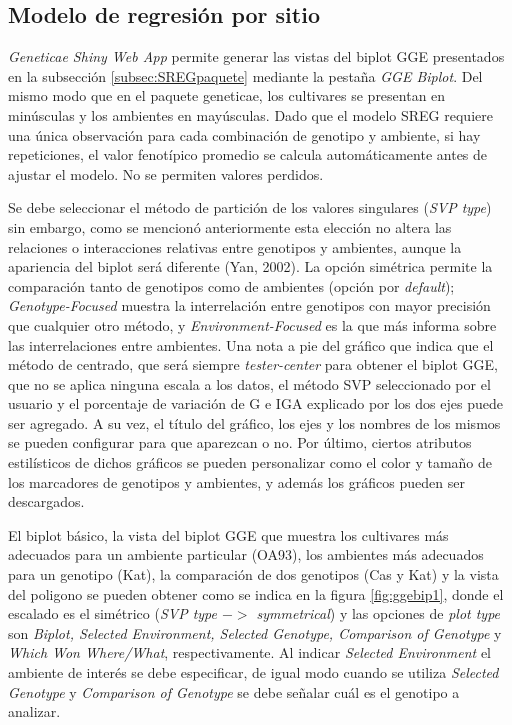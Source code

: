 \subsection{Modelo de regresión por sitio}

\emph{Geneticae Shiny Web App} permite generar las vistas del biplot GGE presentados en la subsección \ref{subsec:SREGpaquete} mediante la pestaña \emph{GGE Biplot}. Del mismo modo que en el paquete geneticae, los cultivares se presentan en minúsculas y los ambientes en mayúsculas. Dado que el modelo SREG requiere una única observación para cada combinación de genotipo y ambiente, si hay repeticiones, el valor fenotípico promedio se calcula automáticamente antes de ajustar el modelo. No se permiten valores perdidos. 

Se debe seleccionar el método de partición de los valores singulares (\emph{SVP type}) sin embargo, como se mencionó anteriormente esta elección no altera las relaciones o interacciones relativas entre genotipos y ambientes, aunque la apariencia del biplot será diferente (Yan, 2002). La opción simétrica permite la comparación tanto de genotipos como de ambientes (opción por \emph{default}); \emph{Genotype-Focused} muestra la interrelación entre genotipos con mayor precisión que cualquier otro método, y \emph{Environment-Focused} es la que más informa sobre las interrelaciones entre ambientes. Una nota a pie del gráfico que indica que el método de centrado, que será siempre \emph{tester-center} para obtener el biplot GGE, que no se aplica ninguna escala a los datos, el método SVP seleccionado por el usuario y el porcentaje de variación de G e IGA explicado por los dos ejes puede ser agregado. A su vez, el título del gráfico, los ejes y los nombres de los mismos se pueden configurar para que aparezcan o no. Por último, ciertos atributos estilísticos de dichos gráficos se pueden personalizar como el color y tamaño de los marcadores de genotipos y ambientes, y además los gráficos pueden ser descargados.  

El biplot básico, la vista del biplot GGE que muestra los cultivares más adecuados para un ambiente particular (OA93), los ambientes más adecuados para un genotipo (Kat), la comparación de dos genotipos (Cas y Kat) y la vista del poligono se pueden obtener como se indica en la figura \ref{fig:ggebip1}, donde el escalado es el simétrico (\emph{SVP type $->$ symmetrical}) y las opciones de \emph{plot type} son \emph{Biplot,
Selected Environment, Selected Genotype, Comparison of Genotype} y \emph{Which Won Where/What}, respectivamente. Al indicar \emph{Selected Environment} el ambiente de interés se debe especificar, de igual modo cuando se utiliza \emph{Selected Genotype} y 
\emph{Comparison of Genotype} se debe señalar cuál es el genotipo a analizar.

